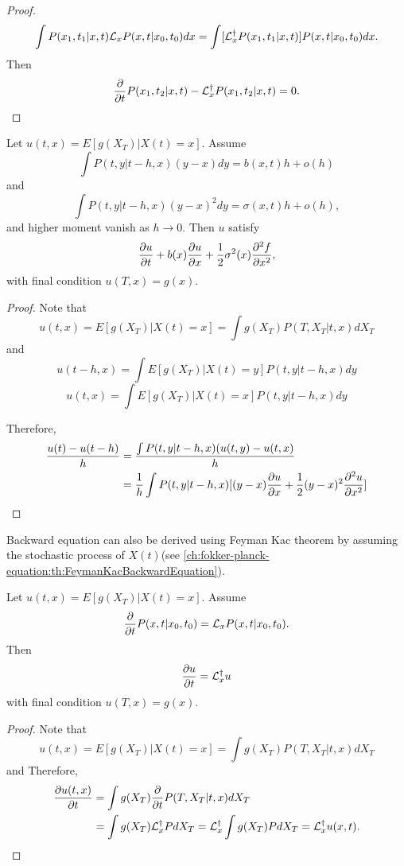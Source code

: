 \begin{refsection}
\begin{proof}
$$\int P(x_1,t_1|x,t)\mathcal{L}_{x}P(x,t|x_0,t_0) dx = \int [\mathcal{L}_x^\dagger P(x_1,t_1|x,t)]P(x,t|x_0,t_0)dx. $$
Then
$$\frac{\partial}{\partial t}P(x_1,t_2|x,t) - \mathcal{L}_{x}^\dagger P(x_1,t_2|x,t) = 0.$$
\end{proof}




\begin{lemma}\label{ch:fokker-planck-equation:th:FokkerPlanckBackwardEquationOnExpectationQuantity}
Let $u(t,x) = E[g(X_T)|X(t) = x]$. Assume $$\int P(t,y|t-h,x)(y-x)dy = b(x,t)h + o(h)$$ and
$$\int P(t,y|t-h,x)(y-x)^2dy = \sigma(x,t)h + o(h),$$
and higher moment vanish as $h\to 0.$ 
 Then $u$ satisfy 
$$\frac{\partial u}{\partial t} + b(x)\frac{\partial u}{\partial x} + \frac{1}{2}\sigma^2(x)\frac{\partial^2 f}{\partial x^2},$$
with final condition $u(T,x) = g(x)$.
\end{lemma}
\begin{proof}
Note that 
$$u(t,x) = E[g(X_T)|X(t) = x] = \int g(X_T)P(T,X_T|t,x) dX_T$$ and
$$u(t-h,x) = \int E[g(X_T)|X(t) = y]P(t,y|t-h,x) dy$$
$$u(t,x) = \int E[g(X_T)|X(t) = x]P(t,y|t-h,x) dy$$

Therefore,
\begin{align*}
\frac{u(t) - u(t-h)}{h} & = \frac{\int P(t,y|t-h,x)(u(t,y) - u(t,x)}{h}\\
&= \frac{1}{h}\int P(t,y|t-h,x)[(y-x)\frac{\partial u}{\partial x} +\frac{1}{2} (y-x)^2\frac{\partial^2 u}{\partial x^2}]
\end{align*}
\end{proof}

\begin{remark}
Backward equation can also be derived using Feyman Kac theorem by assuming the stochastic process of $X(t)$(see \autoref{ch:fokker-planck-equation:th:FeymanKacBackwardEquation}).
\end{remark}

\begin{lemma}\label{ch:fokker-planck-equation:th:FokkerPlanckBackwardEquationOnExpectationQuantityUsingAdjointOperator}
	Let $u(t,x) = E[g(X_T)|X(t) = x]$. Assume
	$$\frac{\partial }{\partial t} P(x,t|x_0,t_0) = \mathcal{L}_x P(x,t|x_0,t_0).$$
	Then
	$$\frac{\partial u}{\partial t} = \mathcal{L}_x^\dagger u$$
	with final condition $u(T,x) = g(x)$.
\end{lemma}
\begin{proof}
	Note that 
	$$u(t,x) = E[g(X_T)|X(t) = x] = \int g(X_T)P(T,X_T|t,x) dX_T$$ and
	Therefore,
	\begin{align*}
	\frac{\partial u(t,x)}{\partial t} & = \int g(X_T) \frac{\partial}{\partial t} P(T,X_T|t,x) dX_T \\
	&= \int g(X_T) \mathcal{L}_x^\dagger P dX_T = \mathcal{L}_x^\dagger \int g(X_T)  P dX_T = \mathcal{L}_x^\dagger u(x,t).
	\end{align*}
\end{proof}


\end{refsection}
